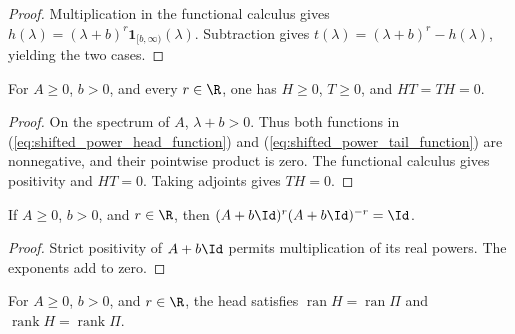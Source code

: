 \begin{proof}
    \leanok
    Multiplication in the functional calculus gives
    $h(\lambda)=(\lambda+b)^r\mathbf1_{[b,\infty)}(\lambda)$.
    Subtraction gives
    $t(\lambda)=(\lambda+b)^r-h(\lambda)$, yielding the two cases.
\end{proof}

\begin{theorem}
    \label{thm:shifted_power_positive_orthogonal}
    \leanok
    For $A\ge0$, $b>0$, and every $r\in\R$, one has
    $H\ge0$, $T\ge0$, and $HT=TH=0$.
\end{theorem}

\begin{proof}
    \leanok
    On the spectrum of $A$, $\lambda+b>0$. Thus both functions in
    (\ref{eq:shifted_power_head_function}) and
    (\ref{eq:shifted_power_tail_function}) are nonnegative, and their
    pointwise product is zero. The functional calculus gives positivity
    and $HT=0$. Taking adjoints gives $TH=0$.
\end{proof}

\begin{theorem}
    \label{thm:shifted_power_inverse}
    \leanok
    If $A\ge0$, $b>0$, and $r\in\R$, then
    $(A+b\Id)^r(A+b\Id)^{-r}=\Id$.
\end{theorem}

\begin{proof}
    \leanok
    Strict positivity of $A+b\Id$ permits multiplication of its real
    powers. The exponents add to zero.
\end{proof}

\begin{theorem}
    \label{thm:shifted_power_head_range}
    \leanok
    For $A\ge0$, $b>0$, and $r\in\R$, the head satisfies
    $\operatorname{ran}H=\operatorname{ran}\Pi$ and
    $\operatorname{rank}H=\operatorname{rank}\Pi$.
\end{theorem}

